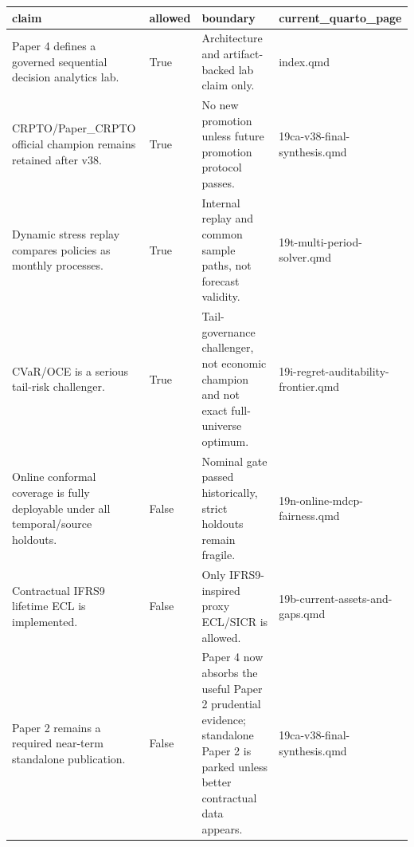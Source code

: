 \documentclass[
  spanish,
  11pt,
  letterpaper,
]{scrbook}
\newcounter{none} %
\theoremstyle{plain}
\theoremstyle{remark}
\begin{document}
{\def\LTcaptype{none} %
\begin{longtable}[]{@{}
  >{\raggedright\arraybackslash}p{}
  >{\raggedright\arraybackslash}p{}
  >{\raggedright\arraybackslash}p{}
  >{\raggedright\arraybackslash}p{}@{}}
\toprule\noalign{}
\begin{minipage}[b]{\linewidth}\raggedright
claim
\end{minipage} & \begin{minipage}[b]{\linewidth}\raggedright
allowed
\end{minipage} & \begin{minipage}[b]{\linewidth}\raggedright
boundary
\end{minipage} & \begin{minipage}[b]{\linewidth}\raggedright
current\_quarto\_page
\end{minipage} \\
\midrule\noalign{}
\endhead
\bottomrule\noalign{}
\endlastfoot
Paper 4 defines a governed sequential decision analytics lab. & True &
Architecture and artifact-backed lab claim only. & index.qmd \\
CRPTO/Paper\_CRPTO official champion remains retained after v38. & True
& No new promotion unless future promotion protocol passes. &
19ca-v38-final-synthesis.qmd \\
Dynamic stress replay compares policies as monthly processes. & True &
Internal replay and common sample paths, not forecast validity. &
19t-multi-period-solver.qmd \\
CVaR/OCE is a serious tail-risk challenger. & True & Tail-governance
challenger, not economic champion and not exact full-universe optimum. &
19i-regret-auditability-frontier.qmd \\
Online conformal coverage is fully deployable under all temporal/source
holdouts. & False & Nominal gate passed historically, strict holdouts
remain fragile. & 19n-online-mdcp-fairness.qmd \\
Contractual IFRS9 lifetime ECL is implemented. & False & Only
IFRS9-inspired proxy ECL/SICR is allowed. &
19b-current-assets-and-gaps.qmd \\
Paper 2 remains a required near-term standalone publication. & False &
Paper 4 now absorbs the useful Paper 2 prudential evidence; standalone
Paper 2 is parked unless better contractual data appears. &
19ca-v38-final-synthesis.qmd \\

\end{longtable}}
\end{document}
